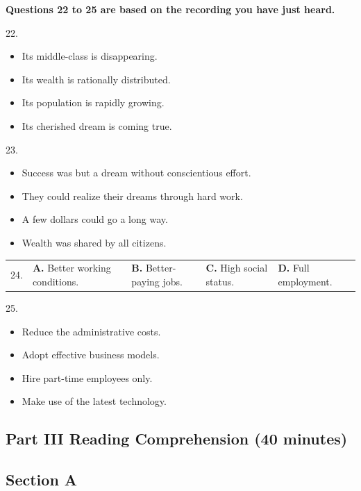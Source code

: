 \documentclass[UTF8,11pt]{ctexart}
\begin{document}
\textbf{Questions 22 to 25 are based on the recording you have just heard.}


22.


\begin{itemize}[leftmargin=2em,itemsep=.2em,topsep=.4em]\item[A.] Its middle-class is disappearing.
\item[B.] Its wealth is rationally distributed.
\item[C.] Its population is rapidly growing.
\item[D.] Its cherished dream is coming true.
\end{itemize}

23.


\begin{itemize}[leftmargin=2em,itemsep=.2em,topsep=.4em]\item[A.] Success was but a dream without conscientious effort.
\item[B.] They could realize their dreams through hard work.
\item[C.] A few dollars could go a long way.
\item[D.] Wealth was shared by all citizens.
\end{itemize}

\noindent\begin{tabularx}{\linewidth}{@{}lXXXX@{}}24. & \textbf{A.} Better working conditions. & \textbf{B.} Better-paying jobs. & \textbf{C.} High social status. & \textbf{D.} Full employment.\\\end{tabularx}\par

25.


\begin{itemize}[leftmargin=2em,itemsep=.2em,topsep=.4em]\item[A.] Reduce the administrative costs.
\item[B.] Adopt effective business models.
\item[C.] Hire part-time employees only.
\item[D.] Make use of the latest technology.
\end{itemize}

\subsection*{\textbf{Part III} \textbf{Reading Comprehension} \textbf{(40 minutes)}}


\subsection*{\textbf{Section A}}
\end{document}
